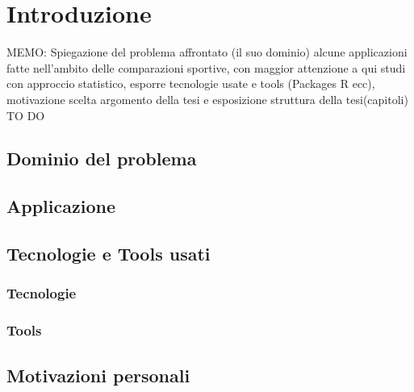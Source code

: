 
\chapter{Introduzione}
\label{cap:introduzione}
MEMO: Spiegazione del problema affrontato (il suo dominio) alcune applicazioni fatte nell'ambito delle comparazioni sportive, con maggior attenzione a qui studi con approccio statistico, esporre tecnologie usate e tools (Packages R ecc), motivazione scelta argomento della tesi e esposizione struttura della tesi(capitoli) TO DO



\section{Dominio del problema}

\section{Applicazione}

\section{Tecnologie e Tools usati}

\subsection{Tecnologie}
\begin{comment}
library(ggmosaic)
library(ggplot2)
library(gridExtra)
\end{comment}

\subsection{Tools}

\section{Motivazioni personali}


